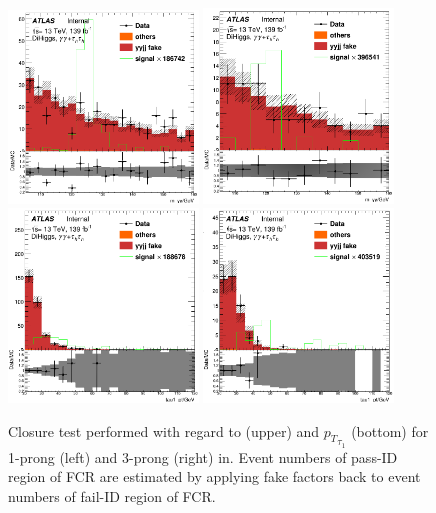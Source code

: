 \begin{figure}
	\centering
	\includegraphics[width=0.45\textwidth]{figures/yy2tau/m_yy_Closure_CR_2taus_invertGam1_1p.png}
	\includegraphics[width=0.45\textwidth]{figures/yy2tau/m_yy_Closure_CR_2taus_invertGam1_3p.png}\\
	\centering
	\includegraphics[width=0.45\textwidth]{figures/yy2tau/tau1_pt_Closure_CR_2taus_invertGam1_1p.png}
	\includegraphics[width=0.45\textwidth]{figures/yy2tau/tau1_pt_Closure_CR_2taus_invertGam1_3p.png}\\
	\caption{\label{fig:yy2tau:Closure} Closure test performed with regard to \myy (upper) and ${p_{T}}_{\tau_{1}}$ (bottom) for 1-prong (left) and 3-prong (right) \tauh in. Event numbers of pass-ID region of FCR are estimated by applying fake factors back to event numbers of fail-ID region of FCR.}
\end{figure}

